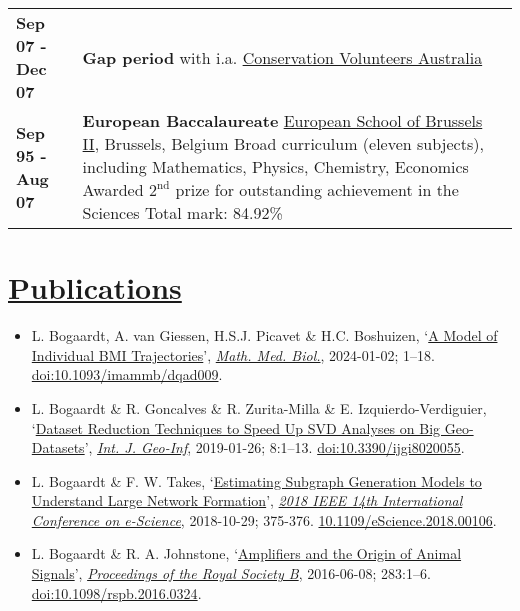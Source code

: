 \documentclass[a4paper,8pt]{extarticle}
\begin{document}
\begin{center}
\begin{tabular}{p{}p{}}
\textbf{Sep 07 - Dec 07}&\textbf{Gap period} with i.a. \href{http://conservationvolunteers.com.au}{Conservation Volunteers Australia}
\vspace{2mm}\\
\textbf{Sep 95 - Aug 07}&\textbf{European Baccalaureate}\newline
\href{http://www.eeb2.be/site/}{European School of Brussels II}, Brussels, Belgium\newline
Broad curriculum (eleven subjects), including Mathematics, Physics, Chemistry, Economics\newline
Awarded $2^\text{nd}$ prize for outstanding achievement in the Sciences\newline
Total mark: 84.92\%
\end{tabular}
\end{center}

\vspace{-1mm}

\section*{\href{http://www.lbogaardt.eu}{Publications}}

\enlargethispage{20mm}

\begin{itemize}[leftmargin=*]
\setlength{\itemsep}{-0.7mm}
\item L. Bogaardt, A. van Giessen, H.S.J. Picavet \& H.C. Boshuizen, `\href{http://www.lbogaardt.eu/?s=7tt}{A Model of Individual BMI Trajectories}', \textit{\href{https://academic.oup.com/imammb/advance-article/doi/10.1093/imammb/dqad009/7505278}{Math. Med. Biol.}}, 2024-01-02; 1--18. \href{https://doi.org/10.1093/imammb/dqad009}{doi:10.1093/imammb/dqad009}.
\item L. Bogaardt \& R. Goncalves \& R. Zurita-Milla \& E. Izquierdo-Verdiguier, `\href{http://www.lbogaardt.eu/?s=9lc}{Dataset Reduction Techniques to Speed Up SVD Analyses on Big Geo-Datasets}', \textit{\href{https://www.mdpi.com/2220-9964/8/2/55}{Int. J. Geo-Inf}}, 2019-01-26; 8:1--13. \href{http://doi.org/10.3390/ijgi8020055}{doi:10.3390/ijgi8020055}.
\item L. Bogaardt \& F. W. Takes, `\href{http://www.lbogaardt.eu/?s=9wn}{Estimating Subgraph Generation Models to Understand Large Network Formation}', \textit{\href{https://ieeexplore.ieee.org/abstract/document/8588725}{2018 IEEE 14th International Conference on e-Science}}, 2018-10-29; 375-376. \href{http://doi.org/10.1109/eScience.2018.00106}{10.1109/eScience.2018.00106}.
\item L. Bogaardt \& R. A. Johnstone, `\href{http://www.lbogaardt.eu/?s=m2p}{Amplifiers and the Origin of Animal Signals}', \textit{\href{http://rspb.royalsocietypublishing.org/content/283/1832/20160324}{Proceedings of the Royal Society B}}, 2016-06-08; 283:1--6. \href{http://doi.org/10.1098/rspb.2016.0324}{doi:10.1098/rspb.2016.0324}.
\end{itemize}
\end{document}
